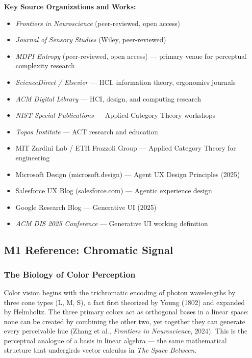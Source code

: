 \documentclass[11pt,letterpaper]{article}
\begin{document}
\textbf{Key Source Organizations and Works:}
\begin{itemize}[itemsep=0.2em]
  \item \textit{Frontiers in Neuroscience} (peer-reviewed, open access)
  \item \textit{Journal of Sensory Studies} (Wiley, peer-reviewed)
  \item \textit{MDPI Entropy} (peer-reviewed, open access) --- primary venue for perceptual complexity research
  \item \textit{ScienceDirect / Elsevier} --- HCI, information theory, ergonomics journals
  \item \textit{ACM Digital Library} --- HCI, design, and computing research
  \item \textit{NIST Special Publications} --- Applied Category Theory workshops
  \item \textit{Topos Institute} --- ACT research and education
  \item MIT Zardini Lab / ETH Frazzoli Group --- Applied Category Theory for engineering
  \item Microsoft Design (microsoft.design) --- Agent UX Design Principles (2025)
  \item Salesforce UX Blog (salesforce.com) --- Agentic experience design
  \item Google Research Blog --- Generative UI (2025)
  \item \textit{ACM DIS 2025 Conference} --- Generative UI working definition
\end{itemize}

\subsection{M1 Reference: Chromatic Signal}

\subsubsection{The Biology of Color Perception}

Color vision begins with the trichromatic encoding of photon wavelengths by three cone types (L, M, S), a fact first theorized by Young (1802) and expanded by Helmholtz. The three primary colors act as orthogonal bases in a linear space: none can be created by combining the other two, yet together they can generate every perceivable hue (Zhang et al., \textit{Frontiers in Neuroscience}, 2024). This is the perceptual analogue of a basis in linear algebra --- the same mathematical structure that undergirds vector calculus in \textit{The Space Between}.
\end{document}
